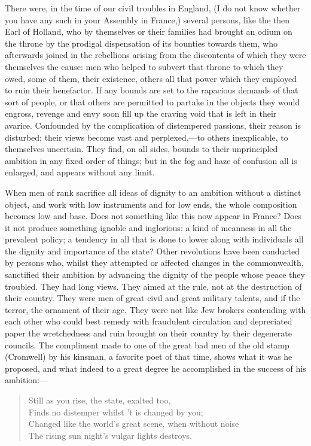 There were, in the time of our civil troubles in England, (I do not know whether you have any such in your Assembly in France,) several persons, like the then Earl of Holland, who by themselves or their families had brought an odium on the throne by the prodigal dispensation of its bounties towards them, who afterwards joined in the rebellions arising from the discontents of which they were themselves the cause: men who helped to subvert that throne to which they owed, some of them, their existence, others all that power which they employed to ruin their benefactor. If any bounds are set to the rapacious demands of that sort of people, or that others are permitted to partake in the objects they would engross, revenge and envy soon fill up the craving void that is left in their avarice. Confounded by the complication of distempered passions, their reason is disturbed; their views become vast and perplexed,—to others inexplicable, to themselves uncertain. They find, on all sides, bounds to their unprincipled ambition in any fixed order of things; but in the fog and haze of confusion all is enlarged, and appears without any limit.

When men of rank sacrifice all ideas of dignity to an ambition without a distinct object, and work with low instruments and for low ends, the whole composition becomes low and base. Does not something like this now appear in France? Does it not produce something ignoble and inglorious: a kind of meanness in all the prevalent policy; a tendency in all that is done to lower along with individuals all the dignity and importance of the state? Other revolutions have been conducted by persons who, whilst they attempted or affected changes in the commonwealth, sanctified their ambition by advancing the dignity of the people whose peace they troubled. They had long views. They aimed at the rule, not at the destruction of their country. They were men of great civil and great military talents, and if the terror, the ornament of their age. They were not like Jew brokers contending with each other who could best remedy with fraudulent circulation and depreciated paper the wretchedness and ruin brought on their country by their degenerate councils. The compliment made to one of the great bad men of the old stamp (Cromwell) by his kinsman, a favorite poet of that time, shows what it was he proposed, and what indeed to a great degree he accomplished in the success of his ambition:—

\begin{verse}
Still as you rise, the state, exalted too, \\
Finds no distemper whilst 't is changed by you; \\
Changed like the world's great scene, when without noise \\
The rising sun night's vulgar lights destroys.
\end{verse}

